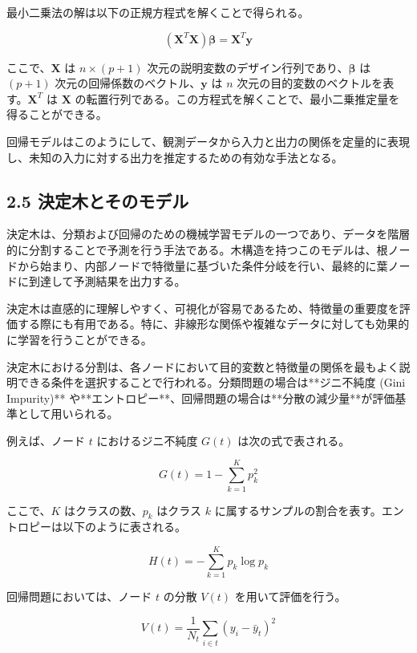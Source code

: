 \begin{itemize}
最小二乗法の解は以下の正規方程式を解くことで得られる。

\begin{equation}
	(\mathbf{X}^T \mathbf{X}) \mathbf{\beta} = \mathbf{X}^T \mathbf{y}
\end{equation}

ここで、$\mathbf{X}$ は $n \times (p+1)$ 次元の説明変数のデザイン行列であり、$\mathbf{\beta}$ は $(p+1)$ 次元の回帰係数のベクトル、$\mathbf{y}$ は $n$ 次元の目的変数のベクトルを表す。$\mathbf{X}^T$ は $\mathbf{X}$ の転置行列である。この方程式を解くことで、最小二乗推定量を得ることができる。

回帰モデルはこのようにして、観測データから入力と出力の関係を定量的に表現し、未知の入力に対する出力を推定するための有効な手法となる。
\end{itemize}

\subsection*{2.5 決定木とそのモデル}
決定木は、分類および回帰のための機械学習モデルの一つであり、データを階層的に分割することで予測を行う手法である。木構造を持つこのモデルは、根ノードから始まり、内部ノードで特徴量に基づいた条件分岐を行い、最終的に葉ノードに到達して予測結果を出力する。

決定木は直感的に理解しやすく、可視化が容易であるため、特徴量の重要度を評価する際にも有用である。特に、非線形な関係や複雑なデータに対しても効果的に学習を行うことができる。

決定木における分割は、各ノードにおいて目的変数と特徴量の関係を最もよく説明できる条件を選択することで行われる。分類問題の場合は**ジニ不純度 (Gini Impurity)** や**エントロピー**、回帰問題の場合は**分散の減少量**が評価基準として用いられる。

例えば、ノード $t$ におけるジニ不純度 $G(t)$ は次の式で表される。

\begin{equation}
	G(t) = 1 - \sum_{k=1}^{K} p_k^2
\end{equation}

ここで、$K$ はクラスの数、$p_k$ はクラス $k$ に属するサンプルの割合を表す。エントロピーは以下のように表される。

\begin{equation}
	H(t) = - \sum_{k=1}^{K} p_k \log p_k
\end{equation}

回帰問題においては、ノード $t$ の分散 $V(t)$ を用いて評価を行う。

\begin{equation}
	V(t) = \frac{1}{N_t} \sum_{i \in t} (y_i - \bar{y}_t)^2
\end{equation}


